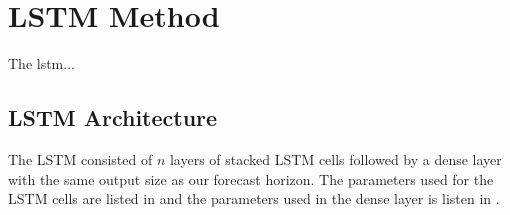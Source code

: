 \section{LSTM Method}
The lstm...





\subsection{LSTM Architecture}
The LSTM consisted of $n$ layers of stacked LSTM cells followed by a
dense layer with the same output size as our forecast horizon.
The parameters used for the LSTM cells are listed in 
and the parameters used in the dense layer is listen in .

